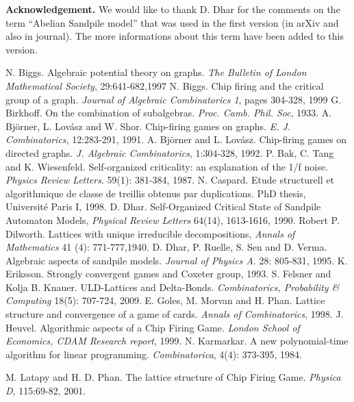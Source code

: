 \documentclass{article}
\theoremstyle{definition}
\begin{document}
\textbf{Acknowledgement.} We would like to thank D. Dhar for the comments on the term ``Abelian Sandpile model'' that was used in the first version (in arXiv and also in journal). The more informations about  this term have been added to this version.
\pagebreak
\begin{thebibliography}{9}
 N. Biggs. Algebraic potential theory on graphs. \emph{The Bulletin of London Mathematical Society}, 29:641-682,1997
 N. Biggs. Chip firing and the critical group of a graph. \emph{Journal of Algebraic Combinatorics 1}, pages 304-328, 1999
 G. Birkhoff. On the combination of subalgebras. \emph{Proc. Camb. Phil. Soc}, 1933.
 A. Bj\"orner, L. Lov\'asz and W. Shor. Chip-firing games on graphs. \emph{E. J. Combinatorics}, 12:283-291, 1991.
 A. Bj\"orner and L. Lov\'asz. Chip-firing games on directed graphs. \emph{J. Algebraic Combinatorics}, 1:304-328, 1992.
 P. Bak, C. Tang and K. Wiesenfeld.  Self-organized criticality: an explanation of the 1/f noise. \emph{Physics Review Letters}. 59(1): 381-384, 1987.
 N. Caspard. Etude structurell et algorithmique de classe de treillis obtenus par duplications. PhD thesis, Universit\'e Paris I, 1998.
 D. Dhar. Self-Organized Critical State of Sandpile Automaton Models, \emph{Physical Review Letters} 64(14), 1613-1616, 1990.
 Robert P. Dilworth. Lattices with unique irreducible decompositions, \emph{Annals of Mathematics} 41 (4): 771-777,1940.
 D. Dhar, P. Ruelle, S. Sen and D. Verma. Algebraic aspects of sandpile models. \emph{Journal of {P}hysics A}. 28: 805-831, 1995.
 K. Eriksson. Strongly convergent games and Coxeter group, 1993.
 S. Felsner and Kolja B. Knauer. ULD-Lattices and Delta-Bonds. \emph{Combinatorics, Probability \& Computing} 18(5): 707-724, 2009.
 E. Goles, M. Morvan and H. Phan. Lattice structure and convergence of a game of cards. \emph{Annals of Combinatorics}, 1998.
 J. Heuvel. Algorithmic aspects of a Chip Firing Game. \emph{London School of Economics, CDAM Research report}, 1999.
 N. Karmarkar. A new polynomial-time algorithm for linear programming. \emph{Combinatorica}, 4(4): 373-395, 1984.

 M. Latapy and H. D.  Phan. The lattice structure of Chip Firing Game. \emph{Physica D}, 115:69-82, 2001.


\end{thebibliography}
\end{document}
